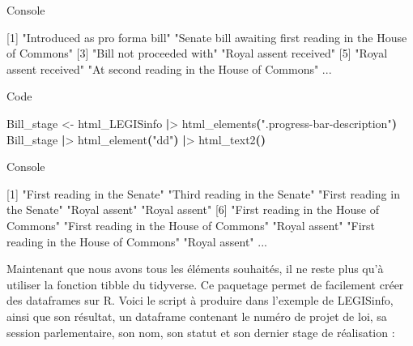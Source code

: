 \documentclass[
  letterpaper,
  DIV=11,
  numbers=noendperiod]{scrreprt}
\newenvironment{Shaded}{\begin{snugshade}}{\end{snugshade}}
\newcommand{\ExtensionTok}[1]{\textcolor[rgb]{0.00,0.23,0.31}{#1}}
\newcommand{\KeywordTok}[1]{\textcolor[rgb]{0.00,0.23,0.31}{\textbf{#1}}}
\newcommand{\NormalTok}[1]{\textcolor[rgb]{0.00,0.23,0.31}{#1}}
\newcommand{\OperatorTok}[1]{\textcolor[rgb]{0.37,0.37,0.37}{#1}}
\newcommand{\StringTok}[1]{\textcolor[rgb]{0.13,0.47,0.30}{#1}}
\begin{document}
Console

\begin{Shaded}
\begin{Highlighting}[]
\ExtensionTok{[1]} \StringTok{"Introduced as pro forma bill"}                                 
\StringTok{"Senate bill awaiting first reading in the House of Commons"}               
 \ExtensionTok{[3]} \StringTok{"Bill not proceeded with"}                                              
 \StringTok{"Royal assent received"}                                                    
 \ExtensionTok{[5]} \StringTok{"Royal assent received"}                                                 
 \StringTok{"At second reading in the House of Commons"}     
\ExtensionTok{...}
\end{Highlighting}
\end{Shaded}

Code

\begin{Shaded}
\begin{Highlighting}[]
\ExtensionTok{Bill\_stage} \OperatorTok{\textless{}}\NormalTok{{-} html\_LEGISinfo }\KeywordTok{|}\OperatorTok{\textgreater{}}\NormalTok{ html\_elements}\KeywordTok{(}\StringTok{".progress{-}bar{-}description"}\KeywordTok{)}
\ExtensionTok{Bill\_stage} \KeywordTok{|}\OperatorTok{\textgreater{}}\NormalTok{ html\_element}\KeywordTok{(}\StringTok{"dd"}\KeywordTok{)} \KeywordTok{|}\OperatorTok{\textgreater{}}\NormalTok{ html\_text2}\KeywordTok{()}
\end{Highlighting}
\end{Shaded}

Console

\begin{Shaded}
\begin{Highlighting}[]
\ExtensionTok{[1]} \StringTok{"First reading in the Senate"}            
\StringTok{"Third reading in the Senate"}            
\StringTok{"First reading in the Senate"}           
\StringTok{"Royal assent"}                        
\StringTok{"Royal assent"}                          
 \ExtensionTok{[6]} \StringTok{"First reading in the House of Commons"} 
 \StringTok{"First reading in the House of }
\StringTok{ Commons"}  \StringTok{"Royal assent"}                          
 \StringTok{"First reading in the House of Commons"}  \StringTok{"Royal assent"}        
\ExtensionTok{...}
 
\end{Highlighting}
\end{Shaded}

Maintenant que nous avons tous les éléments souhaités, il ne reste plus
qu'à utiliser la fonction tibble du tidyverse. Ce paquetage permet de
facilement créer des dataframes sur R. Voici le script à produire dans
l'exemple de LEGISinfo, ainsi que son résultat, un dataframe contenant
le numéro de projet de loi, sa session parlementaire, son nom, son
statut et son dernier stage de réalisation :
\end{document}
